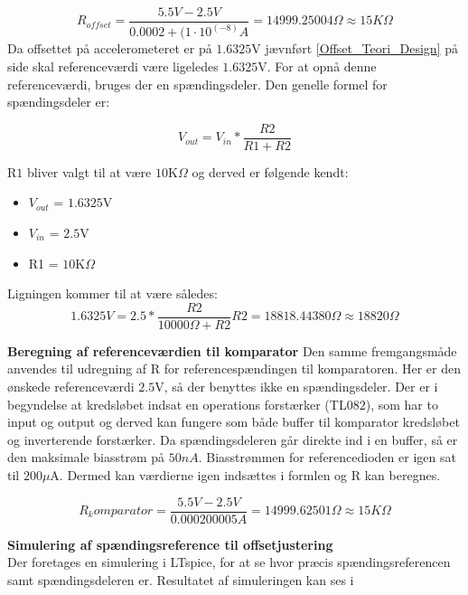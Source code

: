 \begin{equation}
R_{offset}=\frac{5.5V-2.5V}{0.0002 + (1 \cdot 10^(-8)A} = 14999.25004\Omega \approx 15K\Omega
\end{equation}  
Da offsettet på accelerometeret er på $1.6325$V jævnført \ref{Offset_Teori_Design} på side \pageref{Offset_Teori_Design} skal referenceværdi være ligeledes $1.6325$V. For at opnå denne referenceværdi, bruges der en spændingsdeler. Den genelle formel for spændingsdeler er: 

\begin{equation} \label{Spaendingsdeler}
V_{out}=V_{in}*\dfrac{R2}{R1+R2}
\end{equation}

R$1$ bliver valgt til at være $10$K$\Omega$ og derved er følgende kendt: 
\begin{itemize}
\item $V_{out}$  = $1.6325$V
\item $V_{in}$ = $2.5$V
\item R1 = $10$K$\Omega$
\end{itemize}
Ligningen kommer til at være således: 
\begin{equation}
1.6325V = 2.5* \dfrac{R2}{10000\Omega+R2} 
R2 = 18818.44380\Omega \approx 18820\Omega
\end{equation}

\noindent \textbf{Beregning af referenceværdien til komparator}
Den samme fremgangsmåde anvendes til udregning af R for referencespændingen til komparatoren. Her er den ønskede referenceværdi  $2.5$V, så der benyttes ikke en spændingsdeler. Der er i begyndelse at kredsløbet indsat en operations forstærker (TL$082$), som har to input og output og derved kan fungere som både buffer til komparator kredsløbet og inverterende forstærker. Da spændingsdeleren går direkte ind i en buffer, så er den maksimale biasstrøm på $50nA$. Biasstrømmen for referencedioden er igen sat til $200\mu$A. Dermed kan værdierne igen indsættes i formlen og R kan beregnes.

\begin{equation}
R_komparator = \frac{5.5V-2.5V}{0.000200005A} = 14999.62501\Omega \approx 15K\Omega 
\end{equation} 

\textbf{Simulering af spændingsreference til offsetjustering}\\
Der foretages en simulering i LTspice, for at se hvor præcis spændingsreferencen samt spændingsdeleren er. Resultatet af simuleringen kan ses i 

